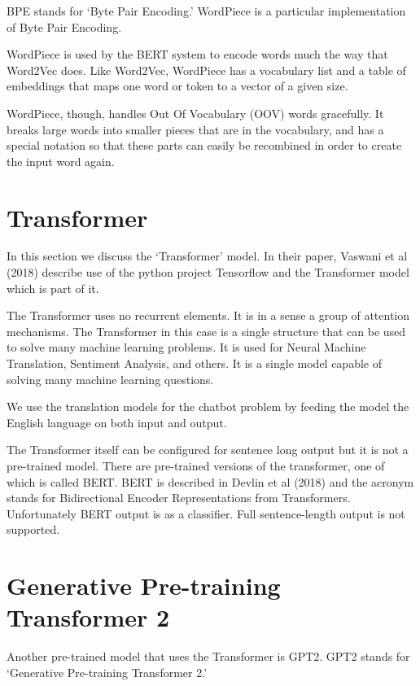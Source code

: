\ac{BPE} stands for `Byte Pair Encoding.' WordPiece is a particular implementation of Byte Pair Encoding.

WordPiece is used by the BERT system to encode words much the way that Word2Vec does. Like Word2Vec, WordPiece  has a vocabulary list and a table of embeddings that maps one word or token to a vector of a given size.

WordPiece, though, handles Out Of Vocabulary (OOV) words gracefully. It breaks large words into smaller pieces that are in the vocabulary, and has a special notation so that these parts can easily be recombined in order to create the input word again.
\fi

\section{Transformer}

In this section we discuss the `Transformer' model. In their paper, Vaswani et al (2018)\cite{tensor2tensor} describe use of the python project Tensorflow and the Transformer model which is part of it.

The Transformer uses no recurrent elements. It is in a sense a group of attention mechanisms. The Transformer in this case is a single structure that can be used to solve many machine learning problems. It is used for Neural Machine Translation, Sentiment Analysis, and others. It is a single model capable of solving many machine learning questions.

We use the translation models for the chatbot problem by feeding the model the English language on both input and output. 

The Transformer itself can be configured for sentence long output but it is not a pre-trained model. There are pre-trained versions of the transformer, one of which is called BERT. BERT is described in Devlin et al (2018)\cite{DBLP:journals/corr/abs-1810-04805} and the acronym stands for Bidirectional Encoder Representations from Transformers. Unfortunately BERT output is as a 
classifier. Full sentence-length output is not supported.

\section{Generative Pre-training Transformer 2}

Another pre-trained model that uses the Transformer is GPT2. GPT2 stands for `Generative Pre-training Transformer 2.'

